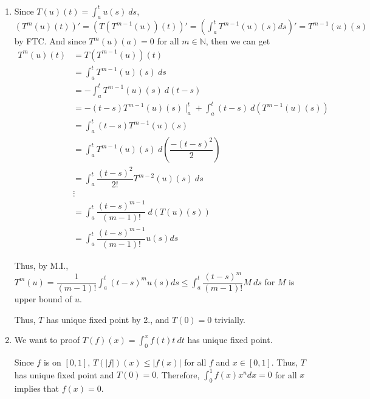 \documentclass[12pt]{article}
\begin{document}
\begin{enumerate}
    \item Since $T(u)(t) = \displaystyle\int_a^t u(s)\ ds$, 
    $\left( T^m(u)(t)\right)' = \left( T(T^{m-1}(u))(t)\right)' = \left( \displaystyle\int_{a}^{t} T^{m-1}(u)(s) ds\right)' = T^{m-1}(u)(s)$ by FTC.
    And since $T^m(u)(a) = 0$ for all $m\in \mathbb{N}$,
    then we can get \begin{align*}
        T^{m}(u)(t) &= T(T^{m-1}(u))(t)\\
        &= \int_{a}^{t} T^{m-1}(u)(s)\ ds\\
        &= -\int_{a}^{t} T^{m-1}(u)(s)\ d(t-s)\\
        &= - (t-s) T^{m-1}(u)(s)\mid_a^t + \int_{a}^{t} (t-s)\ d(T^{m-1}(u)(s))\\
        &= \int_{a}^{t} (t-s)T^{m-1}(u)(s)\\
        &= \int_{a}^{t} T^{m-1}(u)(s)\ d(\dfrac{-(t-s)^2}{2})\\
        &= \int_{a}^{t} \dfrac{(t-s)^2}{2!} T^{m-2}(u)(s)\ ds\\
        &\vdots\\
        &= \int_{a}^{t} \dfrac{(t-s)^{m-1}}{(m-1)!} \ d(T(u)(s))\\
        &= \int_{a}^{t} \dfrac{(t-s)^{m-1}}{(m-1)!} u(s) ds
    \end{align*}

    Thus, by M.I., $T^m(u) = \dfrac{1}{(m-1)!}\displaystyle\int_{a}^{t} (t-s)^m u(s) ds \leq \displaystyle\int_{a}^{t} \dfrac{(t-s)^m}{(m-1)!} M\ ds$ 
    for $M$ is upper bound of $u$.

    Thus, $T$ has unique fixed point by 2., and $T(0) = 0$ trivially.

    \item We want to proof $T(f)(x) = \displaystyle\int_0^x f(t)t\ dt$ has unique fixed point.
    
    Since $f$ is on $[0, 1]$, $T(|f|)(x) \leq |f(x)|$ for all $f$ and $x\in [0, 1]$.
    Thus, $T$ has unique fixed point and $T(0) = 0$. 
    Therefore, $\int_{0}^{1} f(x) x^n dx = 0$ for all $x$ implies that $f(x) = 0$.
\end{enumerate}
\end{document}

